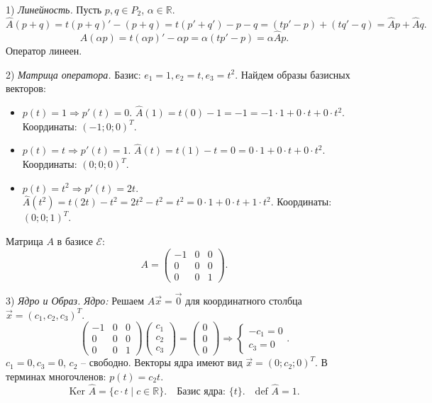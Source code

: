 \documentclass[12pt,a4paper]{article}
\theoremstyle{plain}
\theoremstyle{definition}
\begin{document}
\begin{solbox}
    1) \textit{Линейность.}
    Пусть $p, q \in P_2$, $\alpha \in \mathbb{R}$.
    \[
    \hat{A}(p+q) = t(p+q)' - (p+q) = t(p'+q') - p - q = (tp' - p) + (tq' - q) = \hat{A}p + \hat{A}q.
    \]
    \[
    \hat{A}(\alpha p) = t(\alpha p)' - \alpha p = \alpha(tp' - p) = \alpha \hat{A}p.
    \]
    Оператор линеен.

    2) \textit{Матрица оператора.}
    Базис: $e_1 = 1, e_2 = t, e_3 = t^2$.
    Найдем образы базисных векторов:
    \begin{itemize}
        \item $p(t) = 1 \Rightarrow p'(t)=0$. $\hat{A}(1) = t(0) - 1 = -1 = -1\cdot 1 + 0\cdot t + 0\cdot t^2$. Координаты: $(-1; 0; 0)^T$.
        \item $p(t) = t \Rightarrow p'(t)=1$. $\hat{A}(t) = t(1) - t = 0 = 0\cdot 1 + 0\cdot t + 0\cdot t^2$. Координаты: $(0; 0; 0)^T$.
        \item $p(t) = t^2 \Rightarrow p'(t)=2t$. $\hat{A}(t^2) = t(2t) - t^2 = 2t^2 - t^2 = t^2 = 0\cdot 1 + 0\cdot t + 1\cdot t^2$. Координаты: $(0; 0; 1)^T$.
    \end{itemize}
    Матрица $A$ в базисе $\mathcal{E}$:
    \[
    A = \begin{pmatrix} -1 & 0 & 0 \\ 0 & 0 & 0 \\ 0 & 0 & 1 \end{pmatrix}.
    \]

    3) \textit{Ядро и Образ.}
    \textit{Ядро:} Решаем $A\vec{x}=\vec{0}$ для координатного столбца $\vec{x}=(c_1, c_2, c_3)^T$.
    \[
    \begin{pmatrix} -1 & 0 & 0 \\ 0 & 0 & 0 \\ 0 & 0 & 1 \end{pmatrix} \begin{pmatrix} c_1 \\ c_2 \\ c_3 \end{pmatrix} = \begin{pmatrix} 0 \\ 0 \\ 0 \end{pmatrix} \Rightarrow \begin{cases} -c_1 = 0 \\ c_3 = 0 \end{cases}.
    \]
    $c_1=0, c_3=0$, $c_2$ -- свободно.
    Векторы ядра имеют вид $\vec{x} = (0; c_2; 0)^T$. В терминах многочленов: $p(t) = c_2 t$.
    \[
    \text{Ker } \hat{A} = \{ c \cdot t \mid c \in \mathbb{R} \}. \quad \text{Базис ядра: } \{t\}. \quad \text{def } \hat{A} = 1.
    \]
    

\end{solbox}
\end{document}
